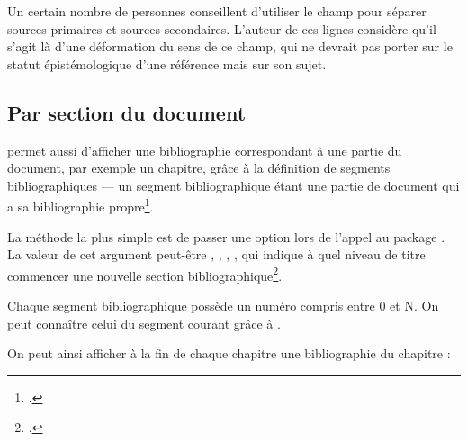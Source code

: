 \begin{plusloins}
    Un certain nombre de personnes conseillent d'utiliser le champ  pour séparer sources primaires et sources secondaires. L'auteur de ces lignes considère qu'il s'agit là d'une déformation du sens de ce champ, qui ne devrait pas porter sur le statut épistémologique d'une référence mais sur son sujet. 
\end{plusloins}

\subsection{Par section du document}

 permet aussi d'afficher une bibliographie correspondant à une partie du document, par exemple un chapitre,  grâce à la définition de segments bibliographiques --- un segment bibliographique étant une partie de document qui a sa bibliographie propre\footcites[En réalité  propose deux choses différentes : \enquote{segment} et \enquote{section} bibliographiques. Seules les sections bibliographiques ont réellement une bibliographie propre, dans la mesure où, si on utilise un style numéroté de bibliographie, la numérotation recommence à chaque changement de section, mais pas à chaque changement de segment. Toutefois il est rare en sciences humaines d'utiliser un style bibliographique numéroté. C'est pourquoi nous ne parlons ici que des segments bibliographiques et non pas des sections bibliographiques. Voir :][ainsi que :]{biblatex_section}[][]{biblatex_segment}.

La méthode la plus simple est de passer une option  lors de l'appel au package . La valeur de cet argument peut-être , , , , qui indique à quel niveau de titre commencer une nouvelle section bibliographique\footcite[Il est toutefois possible de créer des sections bibliographiques autrement que par niveaux de titre, voir :][]{biblatex_segment}.

Chaque segment bibliographique possède un numéro compris entre 0 et N. On peut connaître celui du segment courant grâce à  .

On peut ainsi afficher à la fin de chaque chapitre une bibliographie du chapitre :

